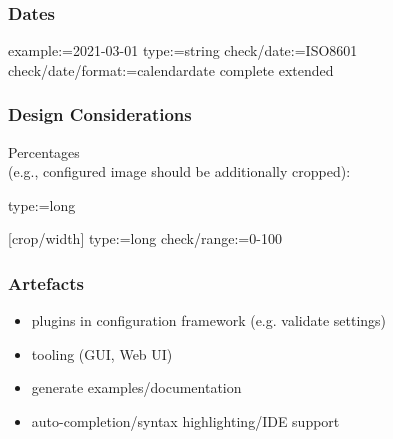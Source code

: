 \begin{frame}[fragile]
	\frametitle{Dates}
	\small
	\begin{code}[morekeywords={type,date,format,example},gobble=4]
	[mydate]
	example:=2021-03-01
	type:=string
	check/date:=ISO8601
	check/date/format:=calendardate complete extended
	\end{code}
\end{frame}

\begin{frame}[fragile]
	\frametitle{Design Considerations}
	Percentages
	\\ (e.g., configured image should be additionally cropped):
	\begin{code}
	type:=long

	[crop/width]
	type:=long
	check/range:=0-100
	\end{code}
\end{frame}

\begin{frame}
	\frametitle{Artefacts}
	\begin{itemize}
	\item plugins in configuration framework (e.g. validate settings)
	\item tooling (GUI, Web UI)
	\item generate examples/documentation
	\item auto-completion/syntax highlighting/IDE support
	\end{itemize}
\end{frame}




